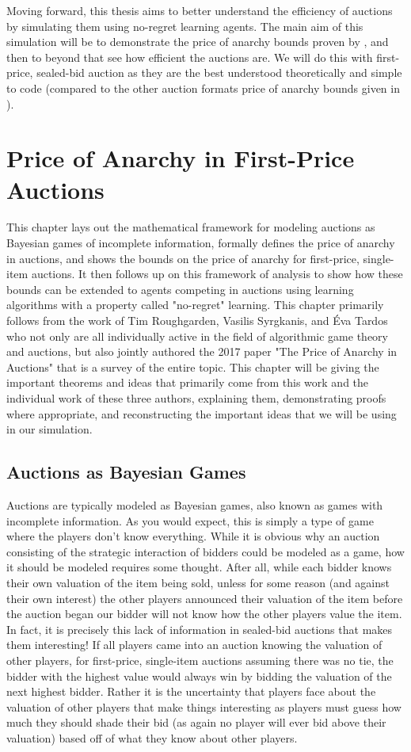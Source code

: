 \documentclass[12pt,twoside]{reedthesis}
\begin{document}
Moving forward, this thesis aims to better understand the efficiency of auctions by simulating them using no-regret learning agents. The main aim of this simulation will be to demonstrate the price of anarchy bounds proven by \cite{Roughgarden2017}, and then to beyond that see how efficient the auctions are. We will do this with first-price, sealed-bid auction as they are the best understood theoretically and simple to code (compared to the other auction formats price of anarchy bounds given in \cite{Roughgarden2007}). 

\chapter{Price of Anarchy in First-Price Auctions}
This chapter lays out the mathematical framework for modeling auctions as Bayesian games of incomplete information, formally defines the price of anarchy in auctions, and shows the bounds on the price of anarchy for first-price, single-item auctions. It then follows up on this framework of analysis to show how these bounds can be extended to agents competing in auctions using learning algorithms with a property called "no-regret" learning. This chapter primarily follows from the work of Tim Roughgarden, Vasilis Syrgkanis, and \'Eva Tardos who not only are all individually active in the field of algorithmic game theory and auctions, but also jointly authored the 2017 paper "The Price of Anarchy in Auctions" that is a survey of the entire topic. This chapter will be giving the important theorems and ideas that primarily come from this work and the individual work of these three authors, explaining them, demonstrating proofs where appropriate, and reconstructing the important ideas that we will be using in our simulation.   

\section{Auctions as Bayesian Games}
Auctions are typically modeled as Bayesian games, also known as games with incomplete information. As you would expect, this is simply a type of game where the players don't know everything. While it is obvious why an auction consisting of the strategic interaction of bidders could be modeled as a game, how it should be modeled requires some thought. After all, while each bidder knows their own valuation of the item being sold, unless for some reason (and against their own interest) the other players announced their valuation of the item before the auction began our bidder will not know how the other players value the item. In fact, it is precisely this lack of information in sealed-bid auctions that makes them interesting! If all players came into an auction knowing the valuation of other players, for first-price, single-item auctions assuming there was no tie, the bidder with the highest value would always win by bidding the valuation of the next highest bidder. Rather it is the uncertainty that players face about the valuation of other players that make things interesting as players must guess how much they should shade their bid (as again no player will ever bid above their valuation) based off of what they know about other players. 
\end{document}

